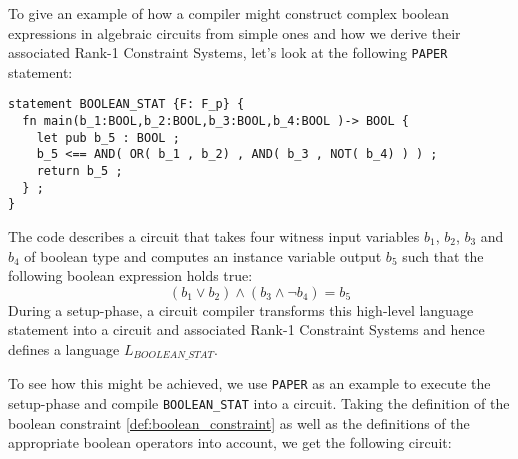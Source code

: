 \begin{example} To give an example of how a compiler might construct complex boolean expressions in algebraic circuits from simple ones and how we derive their associated Rank-1 Constraint Systems, let's look at the following \texttt{PAPER} statement:
\begin{lstlisting}
statement BOOLEAN_STAT {F: F_p} {
  fn main(b_1:BOOL,b_2:BOOL,b_3:BOOL,b_4:BOOL )-> BOOL {
    let pub b_5 : BOOL ;
    b_5 <== AND( OR( b_1 , b_2) , AND( b_3 , NOT( b_4) ) ) ;
    return b_5 ;
  } ;
}
\end{lstlisting}
The code describes a circuit that takes four witness input variables $b_1$, $b_2$, $b_3$ and $b_4$ of boolean type and computes an instance variable output $b_5$ such that the following boolean expression holds true:
$$
\left( b_1 \vee b_2 \right) \wedge (b_3 \wedge \lnot b_4) = b_5
$$
During a setup-phase, a circuit compiler transforms this high-level language statement into a circuit and associated Rank-1 Constraint Systems and hence defines a  language $L_{BOOLEAN\_STAT}$. 

To see how this might be achieved, we use \texttt{PAPER} as an example to execute the setup-phase and compile \texttt{BOOLEAN\_STAT} into a circuit. Taking the definition of the boolean constraint \ref{def:boolean_constraint} as well as the definitions of the appropriate boolean operators into account, we get the following circuit:
\begin{center}
\end{center}
\end{example}
